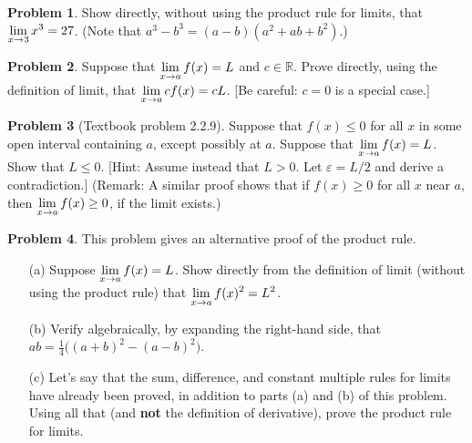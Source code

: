 \documentclass[12pt]{article}
\newcommand{\eps}{\varepsilon}
\newcommand{\R}{{\mathbb R}}
\theoremstyle{definition}
\newtheorem{problem}{Problem}
\newenvironment{answer}{\par\bigskip\bgroup\color{darkblue}}{\egroup}
\begin{document}
\begin{problem}
Show directly, without using the product rule for limits, that $\displaystyle\lim_{x\to 3}x^3 = 27$.
(Note that $a^3-b^3=(a-b)(a^2+ab+b^2)$.)
\end{problem}

\begin{answer}
\end{answer}



\begin{problem}
Suppose that $\displaystyle\lim_{x\to a}f(x)=L$ and $c\in \R$. Prove directly, using the definition of limit,
that $\displaystyle\lim_{x\to a} cf(x) = cL$.  [Be careful: $c=0$ is a special case.]
\end{problem}

\begin{answer}
\end{answer}



\begin{problem}[Textbook problem 2.2.9]
Suppose that $f(x)\le 0$ for all $x$ in some open interval containing $a$, except possibly 
at $a$.  Suppose that $\displaystyle\lim_{x\to a} f(x) = L$.  Show that $L\le 0$. [Hint: Assume instead
that $L > 0$.  Let $\eps=L/2$ and derive a contradiction.]  (Remark: A similar proof shows that
if $f(x)\ge 0$ for all $x$ near $a$, then $\displaystyle\lim_{x\to a}f(x)\ge0$, if the limit exists.)
\end{problem}

\begin{answer}
\end{answer}



\begin{problem}This problem gives an alternative proof of the product rule.
\begin{enumerate}
\item[(a)] Suppose $\displaystyle\lim_{x\to a}f(x)=L$.  Show directly from the definition of limit 
(without using the product rule) that $\displaystyle\lim_{x\to a}f(x)^2=L^2$.
\item[(b)] Verify algebraically, by expanding the right-hand side, that $ab=\frac{1}{4}\big((a+b)^2-(a-b)^2\big)$.
\item[(c)] Let's say that the sum, difference, and constant multiple rules for limits have
already been proved, in addition to parts (a) and (b) of this problem.  Using all that (and \textbf{not}
the definition of derivative), prove the product rule for limits.
\end{enumerate}
\end{problem}

\begin{answer}
\end{answer}
\end{document}
